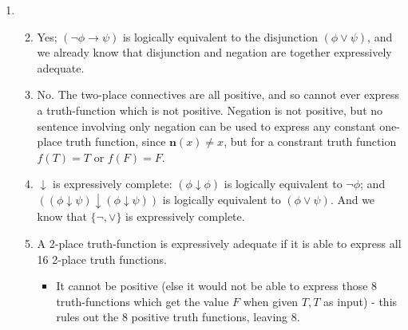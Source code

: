 {\begin{enumerate}
\emph{Induction step}. $\phi$ is complex (a conjunction or conditional), and the induction hypothesis holds of its simpler constituents $\phi$ and $\psi$. Then $\psi$ and $\chi$ both express positive truth functions, $f_{\psi}$ and $f_{\chi}$ – so $f_{\psi}(T,…T) = T = f_{\chi}(T,…,T)$.
\begin{itemize}
 	\item $\phi = (\psi \wedge \chi)$. $\phi$ then expresses the truth function $\mathbf{k}(f_{\psi}(\cdots),f_{\chi}(\cdots))$. Since those constituent truth functions are positive, $$\mathbf{k}(f_{\psi}(T,…,T),f_{\chi}(T,…,T)) = \mathbf{k}(T,T)=T.$$ So $\phi$ expresses a positive truth function too.
 	\item $\phi = (\psi \to \chi)$. $\phi$ then expresses the truth function $\mathbf{c}(f_{\psi}(\cdots),f_{\chi}(\cdots))$. Since those constituent truth functions are positive, $$\mathbf{c}(f_{\psi}(T,…,T),f_{\chi}(T,…,T)) = \mathbf{c}(T,T)=T.$$ So $\phi$ expresses a positive truth function too.
 \end{itemize} 
\setcounter{enumi}{5}
\item  \begin{enumerate}\setcounter{enumii}{1}
	\item Yes; $(¬\phi \to \psi)$ is logically equivalent to the disjunction $(\phi \vee \psi)$, and we already know that disjunction and negation are together expressively adequate. 
	\setcounter{enumii}{3}
	\item No. The two-place connectives are all positive, and so cannot ever express a truth-function which is not positive. Negation is not positive, but no sentence involving only negation can be used to express any constant one-place truth function, since $\mathbf{n}(x) ≠ x$, but for a constrant truth function $f(T)=T$ or $f(F)=F$.
	\item $\downarrow$ is expressively complete: $(\phi\downarrow\phi)$ is logically equivalent to $\neg\phi$; and $((\phi\downarrow\psi)\downarrow(\phi\downarrow\psi))$ is logically equivalent to $(\phi\vee\psi)$. And we know that $\{\neg,\vee\}$ is expressively complete.
	\item A 2-place truth-function is expressively adequate if it is able to express all 16 2-place truth functions. \begin{itemize}
	\item It cannot be positive (else it would not be able to express those 8 truth-functions which get the value $F$ when given $T,T$ as input) - this rules out the 8 positive truth functions, leaving 8.

\end{itemize}
\end{enumerate}
\end{enumerate}}
